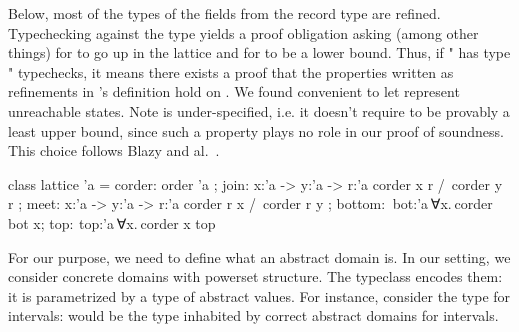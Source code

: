 \documentclass{llncs}
\begin{document}
%
Below, most of the types of the fields from the record type
  are refined.
%
Typechecking  against the type  yields
a proof obligation asking (among other things) for 
to go up in the lattice and for  to be a lower
bound.
%
Thus, if " has type " typechecks, it
means there exists a proof that the properties written as
refinements in 's definition hold on .
%
We found convenient to let  represent unreachable
states.
%
Note  is under-specified, i.e. it doesn't require
 to be provably a least upper bound, since such a
property plays no role in our proof of soundness. This choice
follows Blazy and al.~\cite{SAS13:Blazy:al}.
%
\begin{fstarcode}
class lattice 'a = { corder: order 'a
  ; join: x:'a -> y:'a -> r:'a {corder x r /\ corder y r}
  ; meet: x:'a -> y:'a -> r:'a {corder r x /\ corder r y}
  ; bottom:  bot:'a {∀x. corder bot x}; top:  top:'a {∀x. corder x top}}
\end{fstarcode}
%
For our purpose, we need to define what an abstract domain is. In
our setting, we consider concrete domains with powerset structure.
%
The typeclass  encodes them: it is parametrized by a
type  of abstract values.
%
For instance, consider  the type for intervals:
 would be the type inhabited by correct abstract
domains for intervals.
\end{document}
